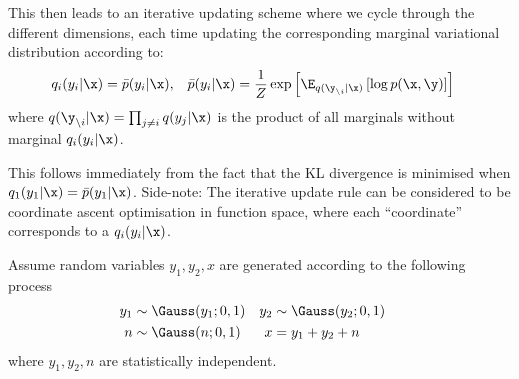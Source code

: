 \begin{exenumerate}
  This then leads to an iterative updating scheme where we cycle
  through the different dimensions, each time updating the corresponding marginal variational distribution according to:
  \begin{align}
    q_i(y_i|\x) &=  \bar{p}(y_i|\x), &  \bar{p}(y_i|\x) &= \frac{1}{Z} \exp\left[ \E_{q(\y_{\setminus i}|\x)}\left[ \log p(\x,\y)\right] \right]
  \end{align}
  where $q(\y_{\setminus i}|\x) = \prod_{j \neq i} q(y_j | \x)$ is the product of all marginals without marginal $q_i(y_i|\x)$.

  \begin{solution}
    This follows immediately from the fact that the KL divergence is
    minimised when $q_1(y_1|\x) = \bar{p}(y_1|\x)$. Side-note: The
    iterative update rule can be considered to be coordinate ascent
    optimisation in function space, where each ``coordinate''
    corresponds to a $q_i(y_i|\x)$.
    
  \end{solution}
\end{exenumerate}


Assume random variables $y_1, y_2, x$ are generated according to the following process
\begin{align}
  y_1 &\sim \Gauss(y_1; 0, 1) &   y_2 &\sim \Gauss(y_2; 0, 1) \\
  n &\sim \Gauss(n; 0, 1)    &    x & = y_1+y_2+n & 
\end{align}
where $y_1, y_2, n$ are statistically independent.

